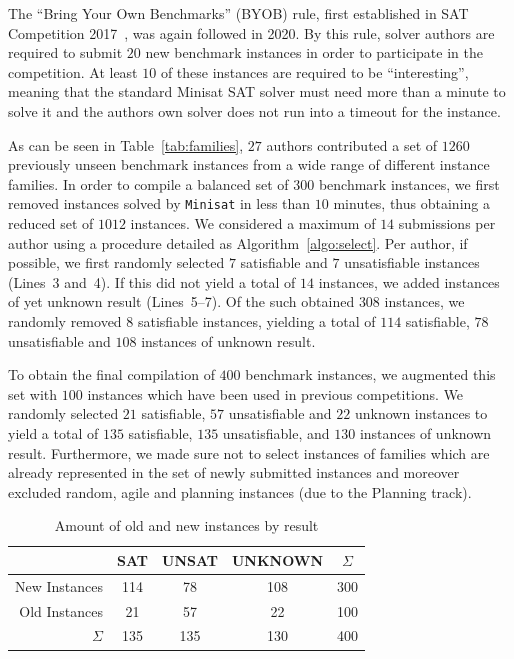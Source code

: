 \documentclass{elsarticle}
\newcommand{\solver}[1]{\texttt{#1}}
\begin{document}
The ``Bring Your Own Benchmarks'' (BYOB) rule, first  established in SAT Competition 2017~\cite{SC2017}, was again followed
in 2020.
By this rule, solver authors are required to submit $20$ new benchmark instances in order to participate in the competition. At least $10$ of these instances are required to be ``interesting'', meaning that the standard Minisat SAT solver
must need more than a minute to solve it and the authors own solver does not run into a timeout for the instance. 

As can be seen in Table~\ref{tab:families}, $27$ authors contributed a set of $1260$ previously unseen benchmark instances from
a wide range of different instance families. 
In order to compile a balanced set of $300$ benchmark instances, we first removed  instances solved by \solver{Minisat} in less than $10$ minutes, thus obtaining a reduced set of $1012$ instances. 
We considered a maximum of $14$ submissions per author using a procedure detailed as Algorithm~\ref{algo:select}. 
Per author, if possible, we first randomly selected $7$ satisfiable and $7$ unsatisfiable instances (Lines~3 and~4). 
If this did not yield a total of $14$ instances, we added instances of yet unknown result (Lines~5--7). 
Of the such obtained $308$ instances, we randomly removed $8$ satisfiable instances, yielding a total of $114$ satisfiable, $78$ unsatisfiable and $108$ instances of unknown result. 

To obtain the final compilation of $400$ benchmark instances, we augmented this set with $100$ instances which have been used in previous competitions. 
We randomly selected $21$ satisfiable, $57$ unsatisfiable and $22$ unknown instances to yield a total of $135$ satisfiable, $135$ unsatisfiable, and $130$ instances of unknown result. 
Furthermore, we made sure not to select instances of families which are already represented in the set of newly submitted instances and moreover excluded random, agile and planning instances (due to the Planning track). 

\begin{table}[t]
\centering\small
\begin{tabular}{rcccc}
 & SAT & UNSAT & UNKNOWN & $\Sigma$\\
\hline\arrayrulecolor{lightgray}
New Instances & 114 & 78 & 108 & 300 \\
Old Instances & 21 & 57 & 22 & 100\\
\hline
$\Sigma$ & 135 & 135 & 130 & 400
\end{tabular}
\caption{Amount of old and new instances by result}
\label{tab:final}
\end{table}
\end{document}
